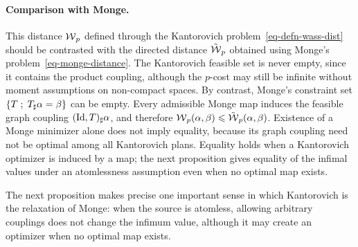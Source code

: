\paragraph{Comparison with Monge.}

	This distance $\operatorname{\mathcal{W}}_p$ defined through the Kantorovich problem~\eqref{eq-defn-wass-dist} should be contrasted with the directed distance $\tilde{\operatorname{\mathcal{W}}}_p$ obtained using Monge's problem~\eqref{eq-monge-distance}. The Kantorovich feasible set is never empty, since it contains the product coupling, although the $p$-cost may still be infinite without moment assumptions on non-compact spaces. By contrast, Monge's constraint set $\left\{ T \;;\; T_\sharp \alpha=\beta \right\}$ can be empty. Every admissible Monge map induces the feasible graph coupling $(\mathrm{Id},T)_\sharp\alpha$, and therefore $\operatorname{\mathcal{W}}_p(\alpha,\beta)\leqslant\tilde{\operatorname{\mathcal{W}}}_p(\alpha,\beta)$. Existence of a Monge minimizer alone does not imply equality, because its graph coupling need not be optimal among all Kantorovich plans. Equality holds when a Kantorovich optimizer is induced by a map; the next proposition gives equality of the infimal values under an atomlessness assumption even when no optimal map exists.

The next proposition makes precise one important sense in which Kantorovich is the relaxation of Monge: when the source is atomless, allowing arbitrary couplings does not change the infimum value, although it may create an optimizer when no optimal map exists.

